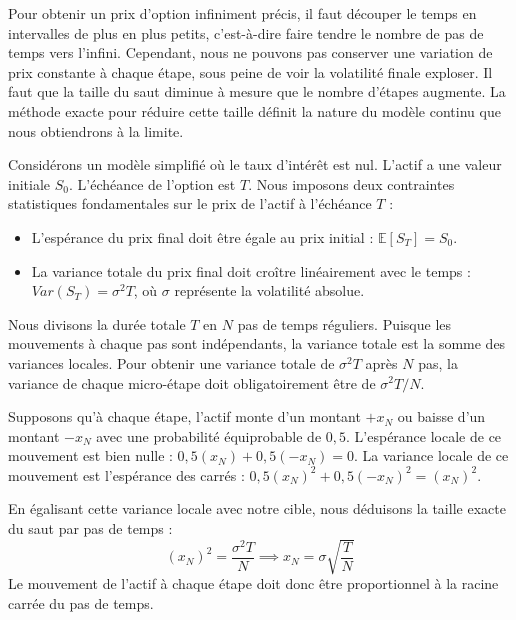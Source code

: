 \begin{intuitionbox}
Pour obtenir un prix d'option infiniment précis, il faut découper le temps en intervalles de plus en plus petits, c'est-à-dire faire tendre le nombre de pas de temps vers l'infini. Cependant, nous ne pouvons pas conserver une variation de prix constante à chaque étape, sous peine de voir la volatilité finale exploser. Il faut que la taille du saut diminue à mesure que le nombre d'étapes augmente. La méthode exacte pour réduire cette taille définit la nature du modèle continu que nous obtiendrons à la limite.
\end{intuitionbox}

\begin{theorembox}
Considérons un modèle simplifié où le taux d'intérêt est nul. L'actif a une valeur initiale $S_0$. L'échéance de l'option est $T$.
Nous imposons deux contraintes statistiques fondamentales sur le prix de l'actif à l'échéance $T$ :
\begin{itemize}[label=$\rightarrow$]
    \item L'espérance du prix final doit être égale au prix initial : $\mathbb{E}[S_T] = S_0$.
    \item La variance totale du prix final doit croître linéairement avec le temps : $Var(S_T) = \sigma^2 T$, où $\sigma$ représente la volatilité absolue.
\end{itemize}
\end{theorembox}

\begin{definitionbox}
Nous divisons la durée totale $T$ en $N$ pas de temps réguliers. 
Puisque les mouvements à chaque pas sont indépendants, la variance totale est la somme des variances locales. Pour obtenir une variance totale de $\sigma^2 T$ après $N$ pas, la variance de chaque micro-étape doit obligatoirement être de $\sigma^2 T / N$.

Supposons qu'à chaque étape, l'actif monte d'un montant $+x_N$ ou baisse d'un montant $-x_N$ avec une probabilité équiprobable de $0,5$.
L'espérance locale de ce mouvement est bien nulle : $0,5(x_N) + 0,5(-x_N) = 0$.
La variance locale de ce mouvement est l'espérance des carrés : $0,5(x_N)^2 + 0,5(-x_N)^2 = (x_N)^2$.

En égalisant cette variance locale avec notre cible, nous déduisons la taille exacte du saut par pas de temps :
\begin{equation*}
    (x_N)^2 = \frac{\sigma^2 T}{N} \implies x_N = \sigma \sqrt{\frac{T}{N}}
\end{equation*}
Le mouvement de l'actif à chaque étape doit donc être proportionnel à la racine carrée du pas de temps.
\end{definitionbox}

